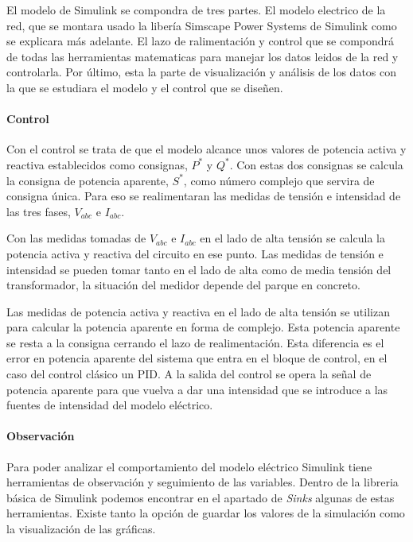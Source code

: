 \documentclass{book}
\begin{document}
El modelo de Simulink se compondra de tres partes. El modelo electrico de la red, que se montara usado la liber\'ia Simscape Power Systems de Simulink como se explicara m\'as adelante. El lazo de ralimentaci\'on y control que se compondr\'a de todas las herramientas matematicas para manejar los datos leidos de la red y controlarla. Por \'ultimo, esta la parte de visualizaci\'on y an\'alisis de los datos con la que se estudiara el modelo y el control que se diseñen.   \par

		\paragraph{Control} 
Con el control se trata de que el modelo alcance unos valores de potencia activa y reactiva establecidos como consignas, $P^*$ y $Q^*$. Con estas dos consignas se calcula la consigna de potencia aparente, $S^*$, como n\'umero complejo que servira de consigna \'unica. Para eso se realimentaran las medidas de tensi\'on e intensidad de las tres fases, $V_{abc}$ e $I_{abc}$. \par

Con las medidas tomadas de $V_{abc}$ e $I_{abc}$ en el lado de alta tensi\'on se calcula la potencia activa y reactiva del circuito en ese punto. Las medidas de tensi\'on e intensidad se pueden tomar tanto en el lado de alta como de media tensi\'on del transformador, la situaci\'on del medidor depende del parque en concreto. \par

Las medidas de potencia activa y reactiva en el lado de alta tensi\'on se utilizan para calcular la potencia aparente en forma de complejo. Esta potencia aparente se resta a la consigna cerrando el lazo de realimentaci\'on. Esta diferencia es el error en potencia aparente del sistema que entra en el bloque de control, en el caso del control cl\'asico un PID. A la salida del control se opera la señal de potencia aparente para que vuelva a dar una intensidad que se introduce a las fuentes de intensidad del modelo el\'ectrico.  \par

		\paragraph{Observaci\'on}
Para poder analizar el comportamiento del modelo el\'ectrico Simulink tiene herramientas de observación y seguimiento de las variables. Dentro de la libreria b\'asica de Simulink podemos encontrar en el apartado de \emph{Sinks} algunas de estas herramientas. Existe tanto la opci\'on de guardar los valores de la simulaci\'on como la visualizaci\'on de las gr\'aficas. \par
\end{document}
